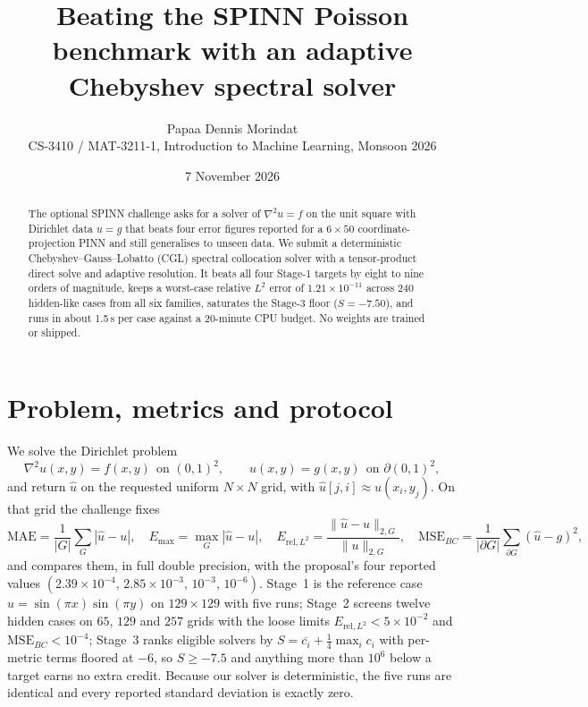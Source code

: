 \documentclass[10pt,a4paper]{article}
\title{\vspace{-1.2cm}\textbf{Beating the SPINN Poisson benchmark with an adaptive\\Chebyshev spectral solver}}
\author{Papaa Dennis Morindat\\\small CS-3410 / MAT-3211-1, Introduction to Machine Learning, Monsoon 2026}
\date{7 November 2026}
\newcommand{\nCases}{240}
\newcommand{\wRel}{1.21\times10^{-11}}
\newcommand{\sComp}{-7.50}
\newcommand{\runMean}{1.5}
\begin{document}
\maketitle
\vspace{-0.9cm}

\begin{abstract}
\noindent
The optional SPINN challenge asks for a solver of $\nabla^2 u = f$ on the unit
square with Dirichlet data $u=g$ that beats four error figures reported for a
$6\times50$ coordinate-projection PINN and still generalises to unseen data.  We
submit a deterministic Chebyshev--Gauss--Lobatto (CGL) spectral collocation
solver with a tensor-product direct solve and adaptive resolution.  It beats all
four Stage-1 targets by eight to nine orders of magnitude, keeps a worst-case
relative $L^2$ error of $\wRel$ across \nCases{} hidden-like cases from all six
families, saturates the Stage-3 floor ($S=\sComp$), and runs in about \runMean\,s
per case against a 20-minute CPU budget.  No weights are trained or shipped.
\end{abstract}

\section{Problem, metrics and protocol}

We solve the Dirichlet problem
\begin{equation}
\nabla^2 u(x,y)=f(x,y)\ \ \text{on }(0,1)^2,
\qquad u(x,y)=g(x,y)\ \ \text{on }\partial(0,1)^2,
\end{equation}
and return $\hat u$ on the requested uniform $N\times N$ grid, with
$\hat u[j,i]\approx u(x_i,y_j)$.  On that grid the challenge fixes
\begin{equation}
\mathrm{MAE}=\frac1{|G|}\sum_{G}|\hat u-u|,\quad
E_{\max}=\max_G|\hat u-u|,\quad
E_{\mathrm{rel},L^2}=\frac{\|\hat u-u\|_{2,G}}{\|u\|_{2,G}},\quad
\mathrm{MSE}_{BC}=\frac{1}{|\partial G|}\sum_{\partial G}(\hat u-g)^2 ,
\end{equation}
and compares them, in full double precision, with the proposal's four reported
values $(2.39\times10^{-4},\,2.85\times10^{-3},\,10^{-3},\,10^{-6})$.
Stage~1 is the reference case $u=\sin(\pi x)\sin(\pi y)$ on $129\times129$ with
five runs; Stage~2 screens twelve hidden cases on $65$, $129$ and $257$ grids
with the loose limits $E_{\mathrm{rel},L^2}<5\times10^{-2}$ and
$\mathrm{MSE}_{BC}<10^{-4}$; Stage~3 ranks eligible solvers by
$S=\overline{c_i}+\tfrac14\max_i c_i$ with per-metric terms floored at $-6$, so
$S\ge-7.5$ and anything more than $10^6$ below a target earns no extra credit.
Because our solver is deterministic, the five runs are identical and every
reported standard deviation is exactly zero.
\end{document}
